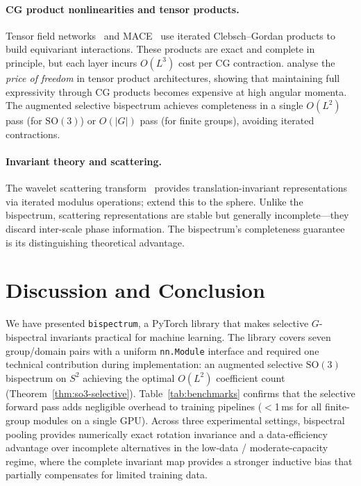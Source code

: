 \documentclass{article}
\theoremstyle{definition}
\theoremstyle{remark}
\newcommand{\SO}{\mathrm{SO}}
\theoremstyle{definition}
\begin{document}
\paragraph{CG product nonlinearities and tensor products.}
Tensor field networks~\citep{thomas2018tensor} and
MACE~\citep{batatia2022mace} use iterated Clebsch--Gordan products
to build equivariant interactions. These products are exact and complete
in principle, but each layer incurs $O(L^3)$ cost per CG contraction.
\citet{xie2025price} analyse the \emph{price of freedom} in tensor
product architectures, showing that maintaining full expressivity through
CG products becomes expensive at high angular momenta.
The augmented selective bispectrum achieves completeness in a single $O(L^2)$
pass (for $\SO(3)$) or $O(|G|)$ pass (for finite groups), avoiding
iterated contractions.

\paragraph{Invariant theory and scattering.}
The wavelet scattering transform~\citep{mallat2012scattering} provides
translation-invariant representations via iterated modulus operations;
\citet{esteves2018spherical} extend this to the sphere. Unlike the
bispectrum, scattering representations are stable but generally
incomplete---they discard inter-scale phase information.
The bispectrum's completeness guarantee~\citep{kakarala2012bispectrum} is its
distinguishing theoretical advantage.

\section{Discussion and Conclusion}
\label{sec:discussion}

We have presented \texttt{bispectrum}, a PyTorch library that makes selective
$G$-bispectral invariants practical for machine learning. The library covers
seven group/domain pairs with a uniform \texttt{nn.Module} interface and
required one technical contribution during implementation: an augmented
selective $\SO(3)$ bispectrum on $S^2$ achieving the optimal $O(L^2)$
coefficient count (Theorem~\ref{thm:so3-selective}). Table~\ref{tab:benchmarks} confirms that the
selective forward pass adds negligible overhead to training pipelines
($<$1\,ms for all finite-group modules on a single GPU). Across three
experimental settings, bispectral pooling provides numerically exact rotation
invariance and a data-efficiency advantage over incomplete alternatives in
the low-data / moderate-capacity regime, where the complete invariant map
provides a stronger inductive bias that partially compensates for
limited training data.
\end{document}
